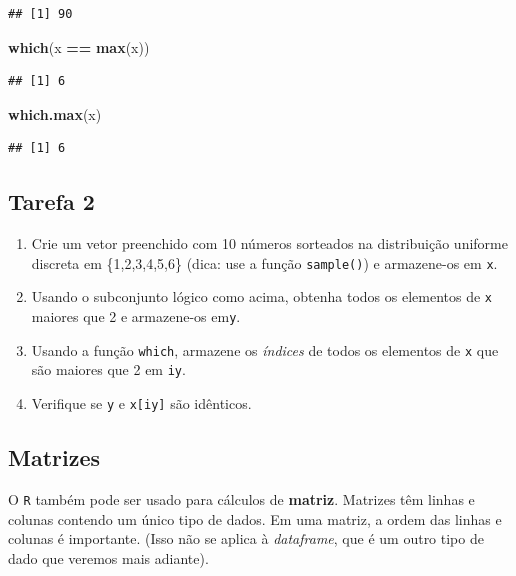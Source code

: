 \documentclass[
]{book}
\newenvironment{Shaded}{\begin{snugshade}}{\end{snugshade}}
\newcommand{\KeywordTok}[1]{\textcolor[rgb]{0.13,0.29,0.53}{\textbf{#1}}}
\newcommand{\NormalTok}[1]{#1}
\newcommand{\OperatorTok}[1]{\textcolor[rgb]{0.81,0.36,0.00}{\textbf{#1}}}
\newcommand{\StringTok}[1]{\textcolor[rgb]{0.31,0.60,0.02}{#1}}
\providecommand{\tightlist}{%
  \setlength{\itemsep}{0pt}\setlength{\parskip}{0pt}}
\theoremstyle{definition}
\theoremstyle{definition}
\theoremstyle{definition}
\theoremstyle{remark}
\begin{document}
\begin{verbatim}
## [1] 90
\end{verbatim}

\begin{Shaded}
\begin{Highlighting}[]
\KeywordTok{which}\NormalTok{(x }\OperatorTok{==}\StringTok{ }\KeywordTok{max}\NormalTok{(x))}
\end{Highlighting}
\end{Shaded}

\begin{verbatim}
## [1] 6
\end{verbatim}

\begin{Shaded}
\begin{Highlighting}[]
\KeywordTok{which.max}\NormalTok{(x)}
\end{Highlighting}
\end{Shaded}

\begin{verbatim}
## [1] 6
\end{verbatim}

\hypertarget{tarefa-2}{%
\subsection{Tarefa 2}\label{tarefa-2}}

\begin{enumerate}
\def\labelenumi{\arabic{enumi}.}
\tightlist
\item
  Crie um vetor preenchido com 10 números sorteados na distribuição uniforme discreta em \{1,2,3,4,5,6\} (dica: use a função \texttt{sample()}) e armazene-os em \texttt{x}.
\item
  Usando o subconjunto lógico como acima, obtenha todos os elementos de \texttt{x} maiores que 2 e armazene-os em\texttt{y}.
\item
  Usando a função \texttt{which}, armazene os \emph{índices} de todos os elementos de \texttt{x} que são maiores que 2 em \texttt{iy}.
\item
  Verifique se \texttt{y} e \texttt{x{[}iy{]}} são idênticos.
\end{enumerate}

\hypertarget{matrizes}{%
\subsection{Matrizes}\label{matrizes}}

O \texttt{R} também pode ser usado para cálculos de \textbf{matriz}. Matrizes têm linhas e colunas contendo um único tipo de dados. Em uma matriz, a ordem das linhas e colunas é importante. (Isso não se aplica à \emph{dataframe}, que é um outro tipo de dado que veremos mais adiante).
\end{document}

